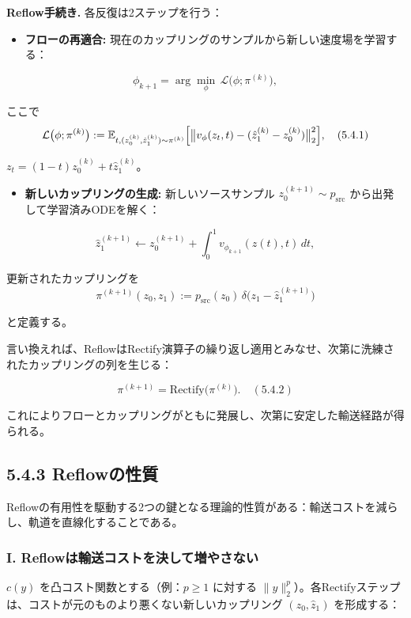 \textbf{Reflow手続き.} 各反復は2ステップを行う：

\begin{itemize}
\item \textbf{フローの再適合:} 現在のカップリングのサンプルから新しい速度場を学習する：
\end{itemize}

\[
\phi_{k+1} = \arg\min_\phi\, \mathcal{L}\bigl(\phi; \pi^{(k)}\bigr),
\]

ここで
\[
\mathcal{L}\bigl(\phi; \pi^{(k)}\bigr) := \mathbb{E}_{t,(z_0^{(k)},\hat{z}_1^{(k)})\sim\pi^{(k)}}\Bigl[\bigl\|v_\phi(z_t, t) - (\hat{z}_1^{(k)} - z_0^{(k)})\bigr\|_2^2\Bigr], \quad (5.4.1)
\]

$z_t = (1-t)z_0^{(k)} + t\hat{z}_1^{(k)}$。

\begin{itemize}
\item \textbf{新しいカップリングの生成:} 新しいソースサンプル $z_0^{(k+1)} \sim p_{\mathrm{src}}$ から出発して学習済みODEを解く：
\end{itemize}

\[
\hat{z}_1^{(k+1)} \leftarrow z_0^{(k+1)} + \int_0^1 v_{\phi_{k+1}}(z(t), t)\, dt,
\]

更新されたカップリングを
\[
\pi^{(k+1)}(z_0, z_1) := p_{\mathrm{src}}(z_0)\, \delta\bigl(z_1 - \hat{z}_1^{(k+1)}\bigr)
\]

と定義する。

言い換えれば、ReflowはRectify演算子の繰り返し適用とみなせ、次第に洗練されたカップリングの列を生じる：

\[
\pi^{(k+1)} = \mathrm{Rectify}\bigl(\pi^{(k)}\bigr). \quad (5.4.2)
\]


これによりフローとカップリングがともに発展し、次第に安定した輸送経路が得られる。

\subsection*{5.4.3 Reflowの性質}


Reflowの有用性を駆動する2つの鍵となる理論的性質がある：輸送コストを減らし、軌道を直線化することである。

\subsubsection*{I. Reflowは輸送コストを決して増やさない}


$c(y)$ を凸コスト関数とする（例：$p \ge 1$ に対する $\|y\|_2^p$）。各Rectifyステップは、コストが元のものより悪くない新しいカップリング $(z_0, \hat{z}_1)$ を形成する：

